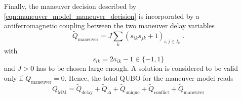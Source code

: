 \documentclass[aps,pra,twocolumn,10pt]{revtex4-1}
\begin{document}
Finally, the maneuver decision described by \eqref{eqn:maneuver_model_maneuver_decision} is incorporated by a antiferromagnetic coupling between the two maneuver delay variables
\begin{equation*}
    \tilde Q_\text{maneuver} = J \sum_k  \left( s_{ik} s_{jk} + 1\right)_{i, j \in I_k} \; .
\end{equation*}
with 
\begin{equation*}
    s_{ik} = 2 a_{ik} - 1 \in \{-1, 1\}
\end{equation*}
and $J>0$ has to be chosen large enough. 
A solution is considered to be valid only if $\tilde Q_\text{maneuver} = 0$.
Hence, the total QUBO for the maneuver model reads
\begin{equation*}
    Q_\text{MM} = \tilde Q_\text{delay} + \tilde Q_\Delta  + \tilde Q_\text{unique} + \tilde Q_\text{conflict} + \tilde Q_\text{maneuver} 
\end{equation*}


\end{document}
